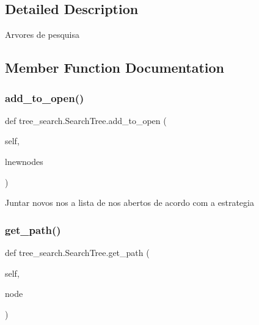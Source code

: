 \subsection{Detailed Description}
\begin{DoxyVerb}Arvores de pesquisa\end{DoxyVerb}
 

\subsection{Member Function Documentation}
\mbox{\label{classtree__search_1_1_search_tree_af851718191e999db984ffba08146b215}} 
\subsubsection{\texorpdfstring{add\+\_\+to\+\_\+open()}{add\_to\_open()}}
{\footnotesize\ttfamily def tree\+\_\+search.\+Search\+Tree.\+add\+\_\+to\+\_\+open (\begin{DoxyParamCaption}\item[{}]{self,  }\item[{}]{lnewnodes }\end{DoxyParamCaption})}

\begin{DoxyVerb}Juntar novos nos a lista de nos abertos de acordo com a estrategia\end{DoxyVerb}
 \mbox{\label{classtree__search_1_1_search_tree_aef56c7770db06ff48c0687e1536a13ed}} 
\subsubsection{\texorpdfstring{get\+\_\+path()}{get\_path()}}
{\footnotesize\ttfamily def tree\+\_\+search.\+Search\+Tree.\+get\+\_\+path (\begin{DoxyParamCaption}\item[{}]{self,  }\item[{}]{node }\end{DoxyParamCaption})}

